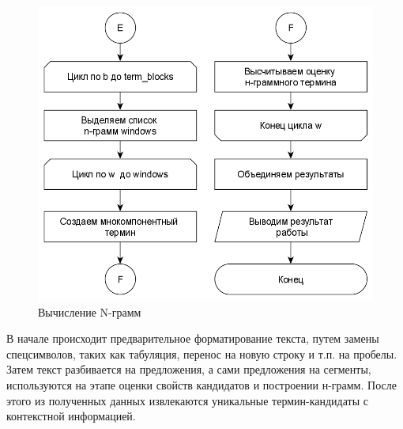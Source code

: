 \begin{figure}[!h]
	\centering
	\includegraphics[width=0.9\linewidth]{src/img/design/yake_3}
	\caption{Вычисление N-грамм}
	\label{fig:yake3}
\end{figure}

В начале происходит предварительное форматирование текста, путем замены спецсимволов, таких как табуляция, перенос на новую строку и т.п. на пробелы.
Затем текст разбивается на предложения, а сами предложения на сегменты, используются на этапе оценки свойств кандидатов и построении н-грамм. 
После этого из полученных данных извлекаются уникальные термин-кандидаты с контекстной информацией.

